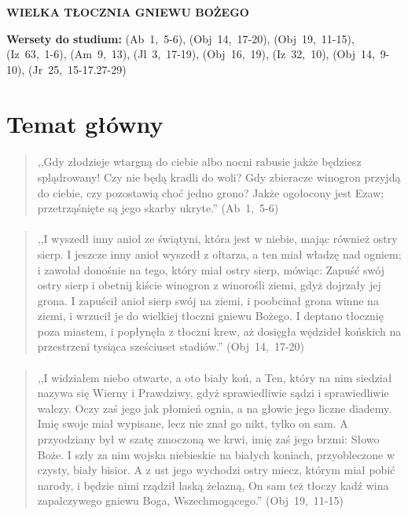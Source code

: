 \documentclass[10pt,a4paper,oneside]{article}
\begin{document}
\centerline{\textbf{\MakeUppercase{Wielka tłocznia gniewu Bożego}}}
\begin{center}
\textbf{Wersety do studium:} \mbox{(Ab 1, 5-6)}, \mbox{(Obj 14, 17-20)}, \mbox{(Obj 19, 11-15)}, \mbox{(Iz 63, 1-6)}, \mbox{(Am 9, 13)}, \mbox{(Jl 3, 17-19)}, \mbox{(Obj 16, 19)}, \mbox{(Iz 32, 10)}, \mbox{(Obj 14, 9-10)}, \mbox{(Jr 25, 15-17.27-29)}
\end{center}
\section{Temat główny}
\paragraph{}
\begin{quote}
,,Gdy złodzieje wtargną do ciebie albo nocni rabusie jakże będziesz splądrowany! Czy nie będą kradli do woli? Gdy zbieracze winogron przyjdą do ciebie, czy pozostawią choć jedno grono? Jakże ogołocony jest Ezaw; przetrząśnięte są jego skarby ukryte.'' \mbox{(Ab 1, 5-6)}
\end{quote}
\paragraph{}
\begin{quote}
,,I wyszedł inny anioł ze świątyni, która jest w niebie, mając również ostry sierp. I jeszcze inny anioł wyszedł z ołtarza, a ten miał władzę nad ogniem; i zawołał donośnie na tego, który miał ostry sierp, mówiąc: Zapuść swój ostry sierp i obetnij kiście winogron z winorośli ziemi, gdyż dojrzały jej grona. I zapuścił anioł sierp swój na ziemi, i poobcinał grona winne na ziemi, i wrzucił je do wielkiej tłoczni gniewu Bożego. I deptano tłocznię poza miastem, i popłynęła z tłoczni krew, aż dosięgła wędzideł końskich na przestrzeni tysiąca sześciuset stadiów.'' \mbox{(Obj 14, 17-20)}
\end{quote}
\paragraph{}
\begin{quote}
,,I widziałem niebo otwarte, a oto biały koń, a Ten, który na nim siedział nazywa się Wierny i Prawdziwy, gdyż sprawiedliwie sądzi i sprawiedliwie walczy. Oczy zaś jego jak płomień ognia, a na głowie jego liczne diademy. Imię swoje miał wypisane, lecz nie znał go nikt, tylko on sam. A przyodziany był w szatę zmoczoną we krwi, imię zaś jego brzmi: Słowo Boże. I szły za nim wojska niebieskie na białych koniach, przyobleczone w czysty, biały bisior. A z ust jego wychodzi ostry miecz, którym miał pobić narody, i będzie nimi rządził laską żelazną, On sam też tłoczy kadź wina zapalczywego gniewu Boga, Wszechmogącego.'' \mbox{(Obj 19, 11-15)}
\end{quote}
\end{document}
